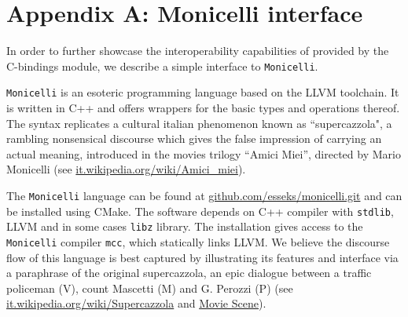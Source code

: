 \documentclass[edipack_sp.tex]{subfiles}
\begin{document}
\section{Appendix A: Monicelli interface}\label{appendixA}
In order to further showcase the interoperability capabilities of
\NAME provided by the C-bindings module, we describe a simple interface to {\tt Monicelli}.

  
{\tt Monicelli} is an esoteric programming language based on the LLVM
toolchain.
It is written in C++ and offers wrappers for the basic
types and operations thereof. The syntax replicates a cultural italian
phenomenon known as ``supercazzola", a rambling nonsensical discourse
which gives the false impression of carrying an actual meaning,
introduced in the movies trilogy ``Amici Miei'', directed by Mario
Monicelli (see
\href{https://it.wikipedia.org/wiki/Amici_miei}{it.wikipedia.org/wiki/Amici\_miei}). 

The {\tt Monicelli} language can be found at
\href{https://github.com/esseks/monicelli.git}{github.com/esseks/monicelli.git}
and can be installed using CMake. The software depends on C++
compiler with {\tt stdlib}, LLVM and in some cases {\tt libz} library. The installation gives access to the {\tt
  Monicelli} compiler {\tt mcc}, which statically links LLVM. 
We believe the discourse flow of this language is best captured by 
illustrating its features and \NAME interface via a paraphrase of the original supercazzola, an epic dialogue between a traffic policeman (V), count Mascetti (M) and G. Perozzi (P) (see
\href{https://it.wikipedia.org/wiki/Supercazzola#Origine}{it.wikipedia.org/wiki/Supercazzola}
and \href{https://www.youtube.com/watch?v=SF8YUFdP6eU}{Movie Scene}). 
\end{document}
